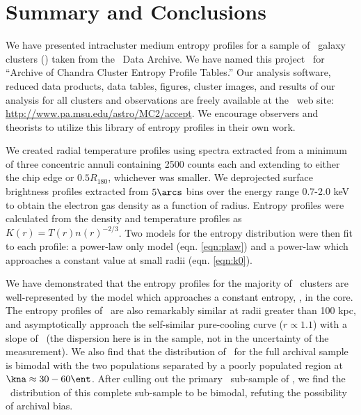 \section{Summary and Conclusions}
\label{sec:entsuppsummary}

We have presented intracluster medium entropy profiles for a sample of
\entsuppnum\ galaxy clusters (\expt) taken from the \chandra\ Data
Archive. We have named this project \accept\ for ``Archive of Chandra
Cluster Entropy Profile Tables.'' Our analysis software, reduced data
products, data tables, figures, cluster images, and results of our
analysis for all clusters and observations are freely available at the
\accept\ web site: \url{http://www.pa.msu.edu/astro/MC2/accept}. We
encourage observers and theorists to utilize this library of entropy
profiles in their own work.

We created radial temperature profiles using spectra extracted from a
minimum of three concentric annuli containing 2500 counts each and
extending to either the chip edge or $0.5 R_{180}$, whichever was
smaller. We deprojected surface brightness profiles extracted from
$5\arcs$ bins over the energy range 0.7-2.0 keV to obtain the
electron gas density as a function of radius. Entropy profiles were
calculated from the density and temperature profiles as $K(r) =
T(r)n(r)^{-2/3}$. Two models for the entropy distribution were then
fit to each profile: a power-law only model (eqn. \ref{eqn:plaw}) and
a power-law which approaches a constant value at small radii
(eqn. \ref{eqn:k0}).

We have demonstrated that the entropy profiles for the majority of
\accept\ clusters are well-represented by the model which approaches a
constant entropy, \kna, in the core. The entropy profiles of
\accept\ are also remarkably similar at radii greater than 100 kpc,
and asymptotically approach the self-similar pure-cooling curve ($r
\propto 1.1$) with a slope of \alphafs\ (the dispersion here is in the
sample, not in the uncertainty of the measurement). We also find that
the distribution of \kna\ for the full archival sample is bimodal with
the two populations separated by a poorly populated region at $\kna
\approx 30-60 \ent$. After culling out the primary \hifl\ sub-sample
of \citet{hiflugcs1}, we find the \kna\ distribution of this complete
sub-sample to be bimodal, refuting the possibility of archival bias.


